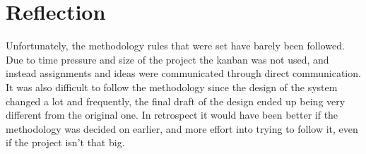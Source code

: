 \section{Reflection}

Unfortunately, the methodology rules that were set have barely been followed. Due to time pressure and size of the project the kanban was not used, and instead assignments and ideas were communicated through direct communication. It was also difficult to follow the methodology since the design of the system changed a lot and frequently, the final draft of the design ended up being very different from the original one. In retrospect it would have been better if the methodology was decided on earlier, and more effort into trying to follow it, even if the project isn't that big.